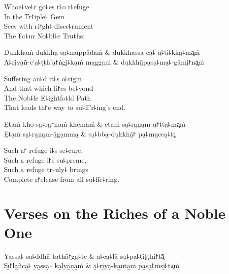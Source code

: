 \begin{english}
  Whoe꜕ve꜕r go꜕es t꜕o r꜕efuge\\
  In the Tr꜓iple꜕ Gem\\
  Sees with ri꜓ght disce꜕rnment\\
  The Fo꜕ur No꜕bl꜕e Truths:
\end{english}

\begin{twochants}
  Du̱kkha̱ṁ du̱kkha̮-sa̮꜕mu̱ppā̱da̱ṁ & du̱kkha̱ssa̮ ca̮꜕ a̮꜕ti̱꜕kka̮꜕ma͓ṁ \\
  A̮꜕ri̮ya̱ñ-c'a̱꜕ṭṭh'a̱꜓ṅgi̮꜕ka̱ṁ ma̱gga̱ṁ & du̱kkhū̱pa̮sa̮꜕ma̮꜕-gā̱mi̮꜓na͓ṁ \\
\end{twochants}

\begin{english}
  Suffering an꜕d it꜕s o꜕rigin\\
  And that which li꜓es be꜕yond ---\\
  The Nob꜕le E꜕ightfo꜕ld Path\\
  That leads th꜓e way to su꜕ff'r꜕ing's end.
\end{english}

\begin{twochants}
  E̱ta̱ṁ kho̱ sa̮꜕ra̮꜓ṇa̱ṁ khe̱ma̱ṁ & e̱ta̱ṁ sa̮꜕ra̮ṇa̮m-u̱꜓tta̮꜕ma͓ṁ \\
  E̱ta̱ṁ sa̮꜕ra̮ṇa̮m-ā̱ga̱mma̮ & sa̱꜕bba̮-du̱kkhā̱꜓ pa̮꜕mu̱cca̮꜕ti͓ \\
\end{twochants}

\begin{english}
  Such a꜓ refuge i꜕s se꜕cure,\\
  Such a refuge i꜓s su꜕preme,\\
  Such a refuge tr꜕uly꜕ brings\\
  Complete r꜓elease from all su꜕ffe꜕ring.
\end{english}

\chapter{Verses on the Riches of a Noble One}


\begin{leader}
\end{leader}

\begin{twochants}
  Ya̱ssa̮꜕ sa̱꜕ddhā̱ ta̮thā̱꜓ga̮꜕te̱ & a̮꜕ca̮꜕lā̱ su̮꜕pa̮꜕ti̱ṭṭhi̮꜓tā͓ \\
  Sī̱꜓la̱ñca̮꜕ ya̱ssa̮꜕ ka̱lyā̱ṇa̱ṁ & a̮꜕ri̮ya̮-ka̱nta̱ṁ pa̮sa̱꜓ṁsi̮꜕ta͓ṁ \\
\end{twochants}

